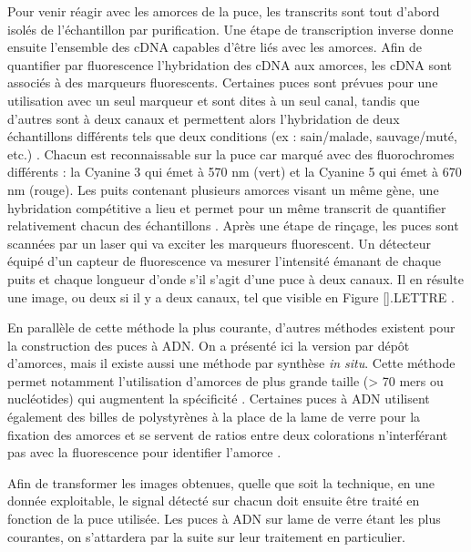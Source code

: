 Pour venir réagir avec les amorces de la puce, les transcrits sont tout d'abord isolés de l'échantillon par purification. Une étape de transcription inverse donne ensuite l'ensemble des cDNA capables d'être liés avec les amorces. Afin de quantifier par fluorescence l'hybridation des cDNA aux amorces, les cDNA sont associés à des marqueurs fluorescents. Certaines puces sont prévues pour une utilisation avec un seul marqueur et sont dites à un seul canal, tandis que d'autres sont à deux canaux et permettent alors l'hybridation de deux échantillons différents tels que deux conditions (ex : sain/malade, sauvage/muté, etc.) \cite{Bumgarner2013Jan}. Chacun est reconnaissable sur la puce car marqué avec des fluorochromes différents : la Cyanine 3 qui émet à  570 nm (vert) et la Cyanine 5 qui émet à 670 nm (rouge). Les puits contenant plusieurs amorces visant un même gène, une hybridation compétitive a lieu et permet pour un même transcrit de quantifier relativement chacun des échantillons \cite{Koltai2008Apr}. Après une étape de rinçage, les puces sont scannées par un laser qui va exciter les marqueurs fluorescent. Un détecteur équipé d'un capteur de fluorescence va mesurer l'intensité émanant de chaque puits et chaque longueur d'onde s'il s'agit d'une puce à deux canaux. Il en résulte une image, ou deux si il y a deux canaux, tel que visible en Figure \ref{}.LETTRE .





En parallèle de cette méthode la plus courante, d'autres méthodes existent pour la construction des puces à ADN. On a présenté ici la version par dépôt d'amorces, mais il existe aussi une méthode par synthèse \textit{in situ}. Cette méthode permet notamment l'utilisation d'amorces de plus grande taille (> 70 mers ou nucléotides) qui augmentent la spécificité \cite{Liu2010}. Certaines puces à ADN utilisent également des billes de polystyrènes à la place de la lame de verre pour la fixation des amorces et se servent de ratios entre deux colorations n'interférant pas avec la fluorescence pour identifier l'amorce \cite{Nesterov-Mueller2014Oct}. 

Afin de transformer les images obtenues, quelle que soit la technique, en une donnée exploitable, le signal détecté sur chacun doit ensuite être traité en fonction de la puce utilisée. Les puces à ADN sur lame de verre étant les plus courantes, on s'attardera par la suite sur leur traitement en particulier.

